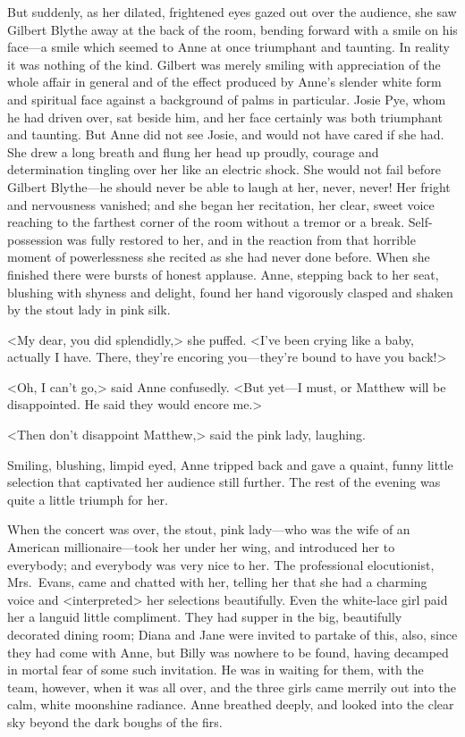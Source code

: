 But suddenly, as her dilated, frightened eyes gazed out over the audience, she saw Gilbert Blythe away at the back of the room, bending forward with a smile on his face—a smile which seemed to Anne at once triumphant and taunting. In reality it was nothing of the kind. Gilbert was merely smiling with appreciation of the whole affair in general and of the effect produced by Anne's slender white form and spiritual face against a background of palms in particular. Josie Pye, whom he had driven over, sat beside him, and her face certainly was both triumphant and taunting. But Anne did not see Josie, and would not have cared if she had. She drew a long breath and flung her head up proudly, courage and determination tingling over her like an electric shock. She would not fail before Gilbert Blythe—he should never be able to laugh at her, never, never! Her fright and nervousness vanished; and she began her recitation, her clear, sweet voice reaching to the farthest corner of the room without a tremor or a break. Self-possession was fully restored to her, and in the reaction from that horrible moment of powerlessness she recited as she had never done before. When she finished there were bursts of honest applause. Anne, stepping back to her seat, blushing with shyness and delight, found her hand vigorously clasped and shaken by the stout lady in pink silk.

<My dear, you did splendidly,> she puffed. <I've been crying like a baby, actually I have. There, they're encoring you—they're bound to have you back!>

<Oh, I can't go,> said Anne confusedly. <But yet—I must, or Matthew will be disappointed. He said they would encore me.>

<Then don't disappoint Matthew,> said the pink lady, laughing.

Smiling, blushing, limpid eyed, Anne tripped back and gave a quaint, funny little selection that captivated her audience still further. The rest of the evening was quite a little triumph for her.

When the concert was over, the stout, pink lady—who was the wife of an American millionaire—took her under her wing, and introduced her to everybody; and everybody was very nice to her. The professional elocutionist, Mrs.~Evans, came and chatted with her, telling her that she had a charming voice and <interpreted> her selections beautifully. Even the white-lace girl paid her a languid little compliment. They had supper in the big, beautifully decorated dining room; Diana and Jane were invited to partake of this, also, since they had come with Anne, but Billy was nowhere to be found, having decamped in mortal fear of some such invitation. He was in waiting for them, with the team, however, when it was all over, and the three girls came merrily out into the calm, white moonshine radiance. Anne breathed deeply, and looked into the clear sky beyond the dark boughs of the firs.

